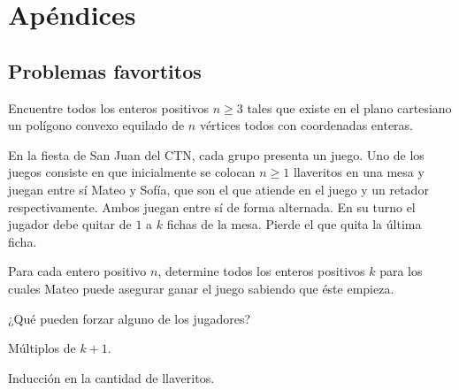 \part{Apéndices}
\appendix
\chapter{Problemas favortitos}
\begin{problem}
Encuentre todos los enteros positivos $n\geq3$ tales que existe
en el plano cartesiano un polígono convexo equilado de $n$ vértices todos
con coordenadas enteras.
\end{problem}

\begin{problem}
En la fiesta de San Juan del CTN,
cada grupo presenta un juego.
Uno de los juegos consiste en que
inicialmente se colocan $n \geq 1$ llaveritos en
una mesa y juegan entre sí
Mateo y Sofía, que son el que atiende en el
juego y un retador respectivamente.
Ambos juegan entre sí de forma alternada.
En su turno el jugador
debe quitar de $1$ a $k$ fichas
de la mesa.
Pierde el que quita la última ficha.

Para cada entero positivo $n$,
determine todos los enteros positivos
$k$ para los cuales Mateo
puede asegurar ganar el juego
sabiendo que éste empieza.
\begin{hints}
	\begin{hint}
		¿Qué pueden forzar alguno de los jugadores?
	\end{hint}
	\begin{hint}
		Múltiplos de $k + 1$.
	\end{hint}
	\begin{hint}
		Inducción en la cantidad de llaveritos.
	\end{hint}
\end{hints}
\end{problem}
